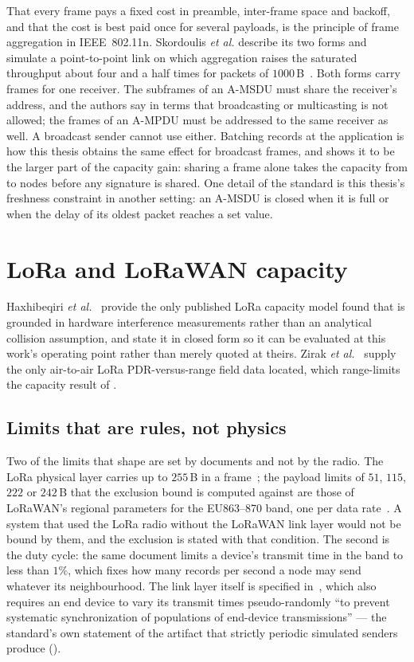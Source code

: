 That every frame pays a fixed cost in preamble, inter-frame space and backoff, and that the
cost is best paid once for several payloads, is the principle of frame aggregation in
IEEE~802.11n. Skordoulis \emph{et al.} describe its two forms and simulate a point-to-point
link on which aggregation raises the saturated throughput about four and a half times for
packets of $1000$\,B~\cite{skordoulis2008aggregation}. Both forms carry frames for one
receiver. The subframes of an A-MSDU must share the receiver's address, and the authors say in
terms that broadcasting or multicasting is not allowed; the frames of an A-MPDU must be
addressed to the same receiver as well. A broadcast sender cannot use either. Batching records
at the application is how this thesis obtains the same effect for broadcast frames, and
 shows it to be the larger part of the capacity gain: sharing a frame alone
takes the capacity from \nmaxLeanBase{} to \nmaxLeanInline{} nodes before any signature is
shared. One detail of the standard is this thesis's freshness constraint in another setting:
an A-MSDU is closed when it is full or when the delay of its oldest packet reaches a set value.

\section{LoRa and LoRaWAN capacity}

Haxhibeqiri \emph{et al.}~\cite{haxhibeqiri2017lora} provide the only published LoRa capacity model found that is
grounded in hardware interference measurements rather than an analytical collision assumption, and
state it in closed form so it can be evaluated at this work's operating point rather than merely
quoted at theirs. Zirak \emph{et al.}~\cite{zirak2021swarm} supply the only air-to-air LoRa PDR-versus-range
field data located, which range-limits the capacity result of .

\subsection{Limits that are rules, not physics}

Two of the limits that shape  are set by documents and not by the radio. The
LoRa physical layer carries up to $255$\,B in a frame~\cite{semtech_sx1276}; the payload limits
of $51$, $115$, $222$ or $242$\,B that the exclusion bound is computed against are those of
LoRaWAN's regional parameters for the EU863--870 band, one per data rate~\cite{lora_rp002}. A
system that used the LoRa radio without the LoRaWAN link layer would not be bound by them, and
the exclusion is stated with that condition. The second is the duty cycle: the same document
limits a device's transmit time in the band to less than $1\%$, which fixes how many records per
second a node may send whatever its neighbourhood. The link layer itself is specified
in~\cite{lorawan_ts001}, which also requires an end device to vary its transmit times
pseudo-randomly ``to prevent systematic synchronization of populations of end-device
transmissions'' --- the standard's own statement of the artifact that strictly periodic
simulated senders produce ().

